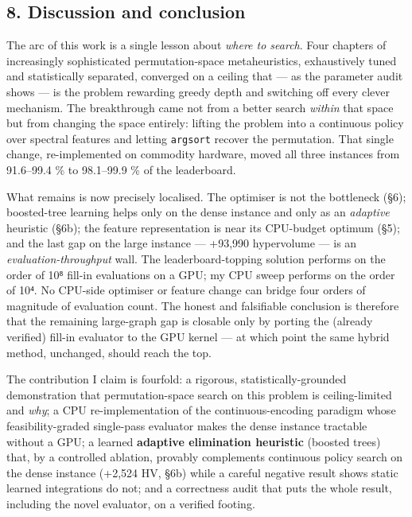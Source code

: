\documentclass[
  11pt,
]{article}
\begin{document}
\hypertarget{discussion-and-conclusion}{%
\subsection{8. Discussion and
conclusion}\label{discussion-and-conclusion}}

The arc of this work is a single lesson about \emph{where to search}.
Four chapters of increasingly sophisticated permutation-space
metaheuristics, exhaustively tuned and statistically separated,
converged on a ceiling that --- as the parameter audit shows --- is the
problem rewarding greedy depth and switching off every clever mechanism.
The breakthrough came not from a better search \emph{within} that space
but from changing the space entirely: lifting the problem into a
continuous policy over spectral features and letting \texttt{argsort}
recover the permutation. That single change, re-implemented on commodity
hardware, moved all three instances from 91.6--99.4 \% to 98.1--99.9 \%
of the leaderboard.

What remains is now precisely localised. The optimiser is not the
bottleneck (§6); boosted-tree learning helps only on the dense instance
and only as an \emph{adaptive} heuristic (§6b); the feature
representation is near its CPU-budget optimum (§5); and the last gap on
the large instance --- +93,990 hypervolume --- is an
\emph{evaluation-throughput} wall. The leaderboard-topping solution
performs on the order of 10⁸ fill-in evaluations on a GPU; my CPU sweep
performs on the order of 10⁴. No CPU-side optimiser or feature change
can bridge four orders of magnitude of evaluation count. The honest and
falsifiable conclusion is therefore that the remaining large-graph gap
is closable only by porting the (already verified) fill-in evaluator to
the GPU kernel --- at which point the same hybrid method, unchanged,
should reach the top.

The contribution I claim is fourfold: a rigorous, statistically-grounded
demonstration that permutation-space search on this problem is
ceiling-limited and \emph{why}; a CPU re-implementation of the
continuous-encoding paradigm whose feasibility-graded single-pass
evaluator makes the dense instance tractable without a GPU; a learned
\textbf{adaptive elimination heuristic} (boosted trees) that, by a
controlled ablation, provably complements continuous policy search on
the dense instance (+2,524 HV, §6b) while a careful negative result
shows static learned integrations do not; and a correctness audit that
puts the whole result, including the novel evaluator, on a verified
footing.
\end{document}
